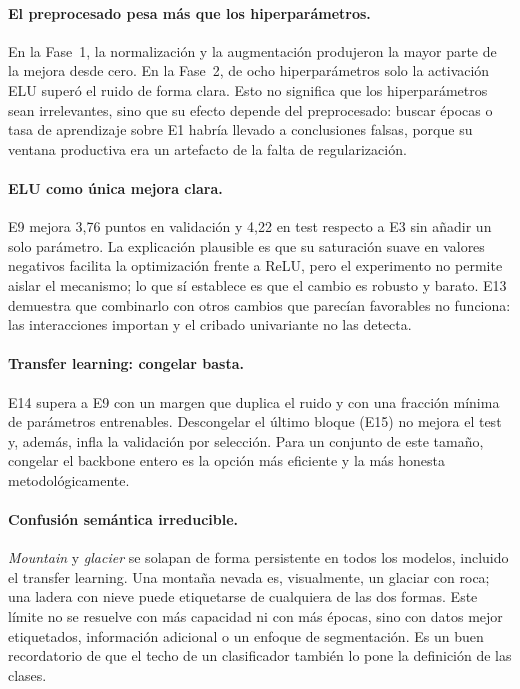 \documentclass[11pt,a4paper]{article}
\begin{document}
\paragraph{El preprocesado pesa más que los hiperparámetros.}
En la Fase~1, la normalización y la augmentación produjeron la mayor parte de la mejora desde cero. En la Fase~2, de ocho hiperparámetros solo la activación ELU superó el ruido de forma clara. Esto no significa que los hiperparámetros sean irrelevantes, sino que su efecto depende del preprocesado: buscar épocas o tasa de aprendizaje sobre E1 habría llevado a conclusiones falsas, porque su ventana productiva era un artefacto de la falta de regularización.

\paragraph{ELU como única mejora clara.}
E9 mejora 3,76 puntos en validación y 4,22 en test respecto a E3 sin añadir un solo parámetro. La explicación plausible es que su saturación suave en valores negativos facilita la optimización frente a ReLU, pero el experimento no permite aislar el mecanismo; lo que sí establece es que el cambio es robusto y barato. E13 demuestra que combinarlo con otros cambios que parecían favorables no funciona: las interacciones importan y el cribado univariante no las detecta.

\paragraph{Transfer learning: congelar basta.}
E14 supera a E9 con un margen que duplica el ruido y con una fracción mínima de parámetros entrenables. Descongelar el último bloque (E15) no mejora el test y, además, infla la validación por selección. Para un conjunto de este tamaño, congelar el backbone entero es la opción más eficiente y la más honesta metodológicamente.

\paragraph{Confusión semántica irreducible.}
\emph{Mountain} y \emph{glacier} se solapan de forma persistente en todos los modelos, incluido el transfer learning. Una montaña nevada es, visualmente, un glaciar con roca; una ladera con nieve puede etiquetarse de cualquiera de las dos formas. Este límite no se resuelve con más capacidad ni con más épocas, sino con datos mejor etiquetados, información adicional o un enfoque de segmentación. Es un buen recordatorio de que el techo de un clasificador también lo pone la definición de las clases.
\end{document}
